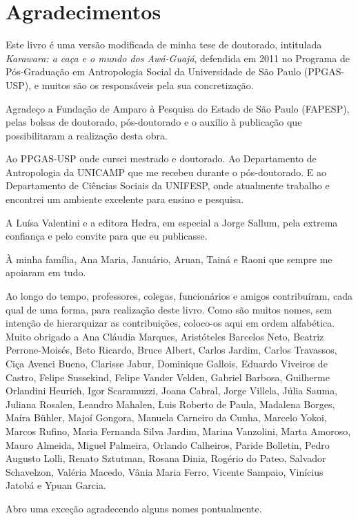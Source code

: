 \chapter*{Agradecimentos}


\noindent Este livro é uma versão modificada de minha tese de doutorado,
intitulada \emph{Karawara: a caça e o mundo dos Awá-Guajá}, defendida em
2011 no Programa de Pós-Graduação em Antropologia Social da Universidade
de São Paulo (PPGAS-USP), e muitos são os responsáveis pela sua
concretização.

Agradeço a Fundação de Amparo à Pesquisa do Estado de São Paulo
(FAPESP), pelas bolsas de doutorado, pós-doutorado e o auxílio à
publicação que possibilitaram a realização desta obra.

Ao PPGAS-USP onde cursei mestrado e doutorado. Ao Departamento de
Antropologia da UNICAMP que me recebeu durante o pós-doutorado. E ao
Departamento de Ciências Sociais da UNIFESP, onde atualmente trabalho e
encontrei um ambiente excelente para ensino e pesquisa.

A Luísa Valentini e a editora Hedra, em especial a Jorge Sallum, pela
extrema confiança e pelo convite para que eu publicasse.

À minha família, Ana Maria, Januário, Aruan, Tainá e Raoni que sempre me
apoiaram em tudo.

Ao longo do tempo, professores, colegas, funcionários e amigos
contribuíram, cada qual de uma forma, para realização deste livro. Como
são muitos nomes, sem intenção de hierarquizar as contribuições,
coloco-os aqui em ordem alfabética. Muito obrigado a Ana Cláudia
Marques, Aristóteles Barcelos Neto, Beatriz Perrone-Moisés, Beto
Ricardo, Bruce Albert, Carlos Jardim, Carlos Travassos, Ciça Avenci
Bueno, Clarisse Jabur, Dominique Gallois, Eduardo Viveiros de Castro,
Felipe Sussekind, Felipe Vander Velden, Gabriel Barbosa, Guilherme
Orlandini Heurich, Igor Scaramuzzi, Joana Cabral, Jorge Villela, Júlia
Sauma, Juliana Rosalen, Leandro Mahalen, Luis Roberto de Paula, Madalena
Borges, Maíra Bühler, Majoí Gongora, Manuela Carneiro da Cunha, Marcelo
Yokoi, Marcos Rufino, Maria Fernanda Silva Jardim, Marina Vanzolini,
Marta Amoroso, Mauro Almeida, Miguel Palmeira, Orlando Calheiros, Paride
Bolletin, Pedro Augusto Lolli, Renato Sztutman, Rosana Diniz, Rogério do
Pateo, Salvador Schavelzon, Valéria Macedo, Vânia Maria Ferro, Vicente
Sampaio, Vinícius Jatobá e Ypuan Garcia.

Abro uma exceção agradecendo alguns nomes pontualmente.

